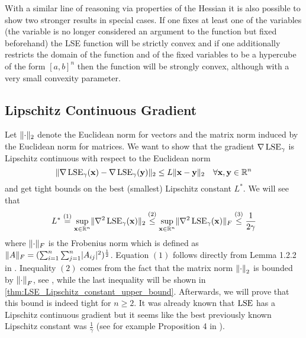 \begin{remark}
 With a similar line of reasoning via properties of the Hessian it is also possible to show two stronger results in special cases.
 If one fixes at least one of the variables (the variable is no longer considered an argument to the function but fixed beforehand)
 the LSE function will be strictly convex and if one additionally restricts the domain of the function and of the fixed variables
 to be a hypercube of the form \([a, b]^n\) then the function will be strongly convex, although with a very small convexity parameter.
\end{remark}



\subsection{Lipschitz Continuous Gradient} \label{sec:LSE_Lipschitz_continuous_gradient}

Let \( \lVert\cdot\rVert_2 \) denote the Euclidean norm for vectors and the matrix norm induced by the Euclidean norm for matrices. 
We want to show that the gradient \(\nabla \operatorname{LSE}_\gamma\) is Lipschitz continuous with respect to the Euclidean norm
\[ \lVert \nabla \operatorname{LSE}_\gamma(\mathbf{x}) - \nabla \operatorname{LSE}_\gamma(\mathbf{y}) \rVert_2 \leq L \lVert \mathbf{x} - \mathbf{y} \rVert_2 \quad \forall \mathbf{x}, \mathbf{y} \in \mathbb{R}^n \]
and get tight bounds on the best (smallest) Lipschitz constant \(L^*\). We will see that
\[ L^* \stackrel{(1)}{=} \sup_{\mathbf{x} \in \mathbb{R}^n} \lVert \nabla^2 \operatorname{LSE}_\gamma(\mathbf{x}) \rVert_2 \stackrel{(2)}{\leq} \sup_{\mathbf{x} \in \mathbb{R}^n} \lVert\nabla^2 \operatorname{LSE}_\gamma(\mathbf{x})\rVert_F \stackrel{(3)}{\leq} \frac{1}{2 \gamma}\]
where \(\lVert\cdot\rVert_F\) is the Frobenius norm which is defined as \(\lVert A\rVert_F = ({ \sum_{i=1}^n \sum_{j=1}^n \lvert A_{ij} \rvert^2 })^{\frac{1}{2}}\).
Equation \((1)\) follows directly from Lemma 1.2.2 in \cite[p. 21]{Nesterov-ConvexOptimization}.
Inequality \((2)\) comes from the fact that the matrix norm \(\left\lVert\cdot\right\rVert_2\) is bounded by \(\left\lVert\cdot\right\rVert_F\), see \cite{GolubVanLoan-MatrixComputations}, 
while the last inequality will be shown in \cref{thm:LSE_Lipschitz_constant_upper_bound}.
Afterwards, we will prove that this bound is indeed tight for \(n \geq 2\).
It was already known that \(\operatorname{LSE}\) has a Lipschitz continuous gradient
but it seems like the best previously known Lipschitz constant was \(\frac{1}{\gamma}\)
(see for example Proposition 4 in \cite{GaoPavel-PropertiesOfTheSoftmaxFunction}).


